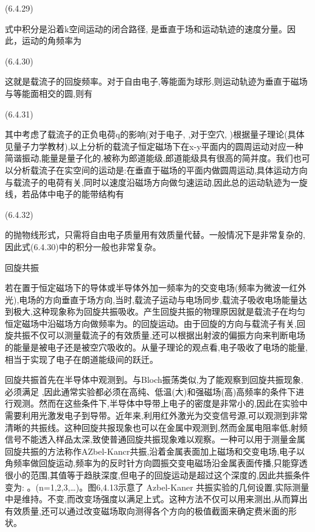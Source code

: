  	(6.4.29)

式中积分是沿着k空间运动的闭合路径, 是垂直于场和运动轨迹的速度分量。因此，运动的角频率为

 	(6.4.30)

这就是载流子的回旋频率。对于自由电子,等能面为球形,则运动轨迹为垂直于磁场与等能面相交的圆,则有

 	(6.4.31)

其中考虑了载流子的正负电荷q的影响(对于电子, ,对于空穴, )根据量子理论(具体见量子力学教材),以上分析的载流子恒定磁场下在x-y平面内的圆周运动对应一种简谐振动,能量是量子化的,被称为郎道能级,郎道能级具有很高的简并度。我们也可以分析载流子在实空间的运动是:在垂直于磁场的平面内做圆周运动,具体运动方向与载流子的电荷有关,同时以速度沿磁场方向做匀速运动,因此总的运动轨迹为一旋线，若品体中电子的能带结构有

 	(6.4.32)

的抛物线形式，只需将自由电子质量用有效质量代替。一般情况下是非常复杂的,因此式(6.4.30)中的积分一般也非常复杂。





回旋共振

若在置于恒定磁场下的导体或半导体外加一频率为的交变电场(频率为微波一红外光),电场的方向垂直于场方向,当时,载流子运动与电场同步,载流子吸收电场能量达到极大,这种现象称为回旋共振吸收。产生回旋共振的物理原因就是载流子在均匀恒定磁场中沿磁场方向做频率为。的回旋运动。由于回旋的方向与载流子有关,回旋共振不仅可以测量载流子的有效质量,还可以根据出射波的偏振方向来判断电场的能量是被电子还是被空穴吸收的。从量子理论的观点看,电子吸收了电场的能量,相当于实现了电子在朗道能级间的跃迁。

回旋共振首先在半导体中观测到。与Bloch振荡类似,为了能观察到回旋共振现象,必须满足 ,因此通常实验都必须在高纯、低温(大)和强磁场(高)高频率的条件下进行观测。然而在这些条件下,半导体中导带上电子的密度是非常小的,因此在实验中需要利用光激发电子到导带。近年来,利用红外激光为交变信号源,可以观测到非常清晰的共振线。这种回旋共报现象也可以在金属中观测到,然而金属电阻率低,射频信号不能透入样品太深,致使普通回旋共振现象难以观察。一种可以用于测量金属回旋共振的方法称作AZbel-Kancr共振,沿着金属表面加上磁场和交变电场,电子以角频率做回旋运动,频率为的反时针方向圆振交变电磁场沿金属表面传播,只能穿透很小的范围,其值等于趋肤深度,但电子的回旋运动是超过这个深度的,因此共振条件变为: 。(n=1,2,3,…)。图6,4.13示意了 Azbel-Kaner 共振实验的几何设置,实际测量中是维持。不变,而改变场强度以满足上式。这种方法不仅可以用来测出,从而算出有效质量,还可以通过改变磁场取向测得各个方向的极值截面来确定费米面的形状。



